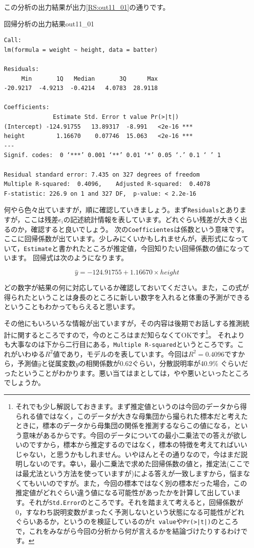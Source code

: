 \documentclass{ltjbook}
\begin{document}
この分析の出力結果が出力\ref{RS:out11_01}の通りです。

\begin{Rscreen}{回帰分析の出力結果}{out11_01}
	\begin{verbatim}
Call:
lm(formula = weight ~ height, data = batter)

Residuals:
     Min       1Q   Median       3Q      Max 
-20.9217  -4.9213  -0.4214   4.0783  28.9118 

Coefficients:
              Estimate Std. Error t value Pr(>|t|)    
(Intercept) -124.91755   13.89317  -8.991   <2e-16 ***
height         1.16670    0.07746  15.063   <2e-16 ***
---
Signif. codes:  0 ‘***’ 0.001 ‘**’ 0.01 ‘*’ 0.05 ‘.’ 0.1 ‘ ’ 1

Residual standard error: 7.435 on 327 degrees of freedom
Multiple R-squared:  0.4096,	Adjusted R-squared:  0.4078 
F-statistic: 226.9 on 1 and 327 DF,  p-value: < 2.2e-16
    \end{verbatim}
\end{Rscreen}

何やら色々出ていますが，順に確認していきましょう。まず\texttt{Residuals}とありますが，ここは残差$e_i$の記述統計情報を表しています。どれぐらい残差が大きく出るのか，確認すると良いでしょう。
次の\texttt{Coefficientes}は係数という意味です。ここに回帰係数が出ています。少しみにくいかもしれませんが，表形式になっていて，\texttt{Estimate}と書かれたところが推定値，今回知りたい回帰係数の値になっています。
回帰式は次のようになります。

\[ \hat{y} = -124.91755 + 1.16670 \times height \]

どの数字が結果の何に対応しているか確認しておいてください。また，この式が得られたということは身長のところに新しい数字を入れると体重の予測ができるということもわかってもらえると思います。

その他にもいろいろな情報が出ていますが，その内容は後期でお話しする推測統計に関するところですので，今のところはまだ知らなくてOKです\footnote{それでも少し解説しておきます。まず推定値というのは今回のデータから得られる値ではなく，このデータが大きな母集団から撮られた標本だと考えたときに，標本のデータから母集団の関係を推測するならこの値になる，という意味があるからです。今回のデータについての最小二乗法での答えが欲しいのですから，標本から推定するのではなく，標本の特徴を考えてればいいじゃない，と思うかもしれません。いやほんとその通りなので，今はまだ説明しないのです。幸い，最小二乗法で求めた回帰係数の値と，推定法(ここでは最尤法という方法を使っていますが)による答えが一致しますから，悩まなくてもいいのですが。また，今回の標本ではなく別の標本だった場合，この推定値がどれぐらい違う値になる可能性があったかを計算して出しています。それが\texttt{Std.Error}のところです。それを踏まえて考えると，回帰係数が0，すなわち説明変数がまったく予測しないという状態になる可能性がどれぐらいあるか，というのを検証しているのが\texttt{t value}や\texttt{Pr(>|t|)}のところで，これをみながら今回の分析から何が言えるかを結論づけたりするわけです。}。
それよりも大事なのは下から二行目にある，\texttt{Multiple R-squared}というところです。これがいわゆる$R^2$値であり，モデルのを表しています。今回は$R^2=0.4096$ですから，予測値$\hat{y}$と従属変数$y$の相関係数が0.62ぐらい，分散説明率が40.9\% ぐらいだったということがわかります。悪い当てはまとしては，やや悪いといったところでしょうか。
\end{document}
